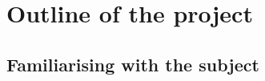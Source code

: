 \chapter{Outline of the project}
\label{chap:outline}

\section{Familiarising with the subject}
\label{sec:familiarising}

